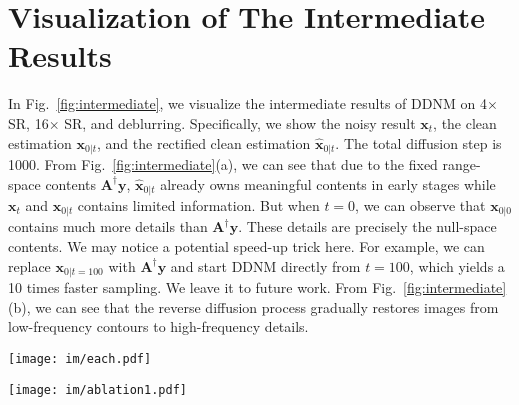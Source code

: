 \documentclass{article} \usepackage{iclr2023_conference,times}
\begin{document}
\section{Visualization of The Intermediate Results}
\label{ddnm visualization}
In Fig.~\ref{fig:intermediate}, we visualize the intermediate results of DDNM on 4$\times$ SR, 16$\times$ SR, and deblurring. Specifically, we show the noisy result $\mathbf{x}_{t}$, the clean estimation $\mathbf{x}_{0|t}$, and the rectified clean estimation $\hat{\mathbf{x}}_{0|t}$. The total diffusion step is 1000. From Fig.~\ref{fig:intermediate}(a), we can see that due to the fixed range-space contents $\mathbf{A}^{\dagger}\mathbf{y}$, $\hat{\mathbf{x}}_{0|t}$ already owns meaningful contents in early stages while $\mathbf{x}_{t}$ and $\mathbf{x}_{0|t}$ contains limited information. But when $t=0$, we can observe that $\mathbf{x}_{0|0}$ contains much more details than $\mathbf{A}^{\dagger}\mathbf{y}$. These details are precisely the null-space contents. We may notice a potential speed-up trick here. For example, we can replace $\mathbf{x}_{0|t=100}$ with $\mathbf{A}^{\dagger}\mathbf{y}$ and start DDNM directly from $t=100$, which yields a 10 times faster sampling. We leave it to future work. From Fig.~\ref{fig:intermediate}(b), we can see that the reverse diffusion process gradually restores images from low-frequency contours to high-frequency details.

\newpage


\begin{figure*}[ht]
  \centering
   \vspace{-0.5cm}
  \texttt{[image: im/each.pdf]}
   \vspace{-0.5cm}
  \caption{Visualization of different degradation operators. (a) Bicubic downsampler. The scale factors from left to right are $\times$4, $\times$8, $\times$16, $\times$32; (b) Average-pooling downsampler. The scale factors from left to right are $\times$4, $\times$8, $\times$16, $\times$32; (c) Blur operators. The type of kernels from left to right are Gaussian, uniform, and anisotropic; (d) Masks; (e) Walsh-Hadamard sampling matrix. The sampling ratios from left to right are 0.5 and 0.25; (f) Block-based sampling matrix. The sampling ratios from left to right are 0.4, 0.3, 0.2, 0.1, 0.05; (g) Grayscale operator.}
\label{fig:all_degradation} 
\end{figure*}

\begin{figure*}[ht]
  \centering
   \vspace{-0.2cm}
  \texttt{[image: im/ablation1.pdf]}
   \vspace{-0.5cm}
  \caption{Visualization of the intermediate results in DDNM. Zoom-in for the best view.}
   \vspace{-0.8cm}
\label{fig:intermediate} 
\end{figure*}
\end{document}

